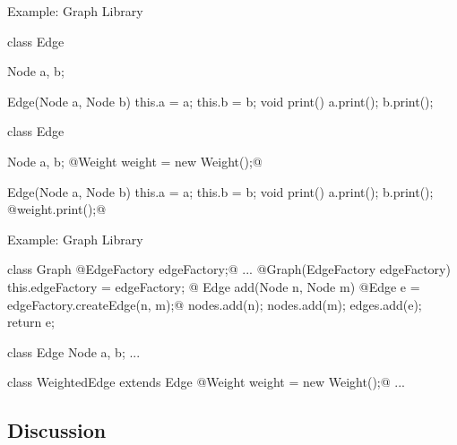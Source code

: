 \begin{frame}[fragile]{Example: Graph Library}
	\begin{mycolumns}[b,columns=3,widths={50,32},height=\textheightwithtitle,animation=none]
		\hfill{} %
	\mynextcolumn
\begin{codetight}{}
class Edge {
	Node a, b;

	Edge(Node a, Node b) {
		this.a = a; this.b = b;
	}
	void print() {
		a.print(); b.print();
	}
}
\end{codetight}
\vspace{2mm}
\begin{codetight}{}
class Edge {
	Node a, b;
	@Weight weight = new Weight();@

	Edge(Node a, Node b) {
		this.a = a; this.b = b;
	}
	void print() {
		a.print(); b.print();
		@weight.print();@
	}
}
\end{codetight}
	\mynextcolumn
	\end{mycolumns}
\end{frame}

\begin{frame}[fragile]{Example: Graph Library}
	\begin{mycolumns}[b,columns=3,widths={50,43},height=\textheightwithtitle,animation=none]
		\hfill{} %
	\mynextcolumn
\begin{codetight}{}
class Graph {
	@EdgeFactory edgeFactory;@
	...
	@Graph(EdgeFactory edgeFactory) {
		this.edgeFactory = edgeFactory;
	}@
	Edge add(Node n, Node m) {
		@Edge e = edgeFactory.createEdge(n, m);@
		nodes.add(n); nodes.add(m); edges.add(e);
		return e;
	}
}
\end{codetight}
\begin{codetight}{}
class Edge {
	Node a, b;
	...
}
\end{codetight}
\vspace{2mm}
\begin{codetight}{}
class WeightedEdge extends Edge {
	@Weight weight = new Weight();@
	...
}
\end{codetight}
	\mynextcolumn
	\end{mycolumns}
\end{frame}

\subsection{Discussion}

